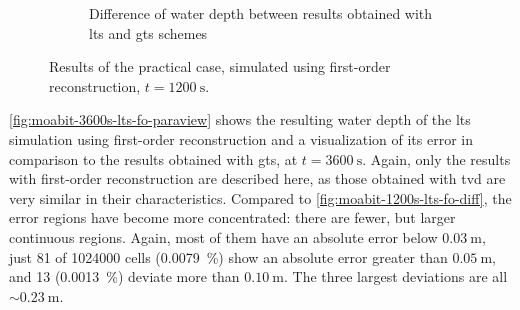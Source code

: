 \begin{figure} [p]
\begin{subfigure}[t]{0.45\textwidth}
    \caption{
      Difference of water depth between results obtained with \acrshort{lts} and \acrshort{gts} schemes
    }
    \label{fig:moabit-1200s-lts-fo-diff}

  \end{subfigure}
  \caption{Results of the practical case, simulated using first-order reconstruction,  
  $t = \SI{1200}{\second}$.}
  \label{fig:moabit-1200s-lts-fo-paraview}
\end{figure}

\autoref{fig:moabit-3600s-lts-fo-paraview} shows the resulting water depth of the \gls{lts} simulation using first-order reconstruction and a visualization of its error in comparison to the results obtained with \gls{gts}, at $t=\SI{3600}{\second}$.
Again, 
only the results with first-order reconstruction are described here, as those obtained with \gls{tvd} are very similar in their characteristics.
Compared to \autoref{fig:moabit-1200s-lts-fo-diff}, the error regions have become more concentrated: there are fewer, but larger continuous regions. 
Again, most of them have an absolute error below $\SI{0.03}{\meter}$, just 81 of 1024000 cells (\SI{0.0079}{\percent}) show an absolute error greater than $\SI{0.05}{\meter}$,
and 13 (\SI{0.0013}{\percent}) deviate more than $\SI{0.10}{\meter}$. 
The three largest deviations are all $\sim\!\SI{0.23}{\meter}$.

